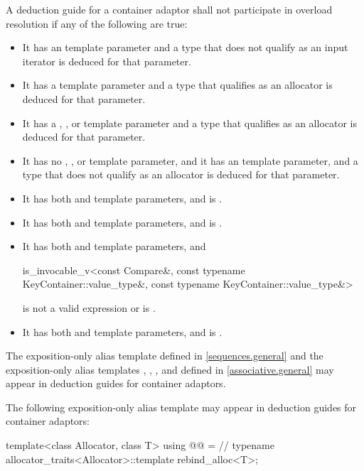 \pnum
A deduction guide for a container adaptor shall not participate in overload resolution if any of the following are true:
\begin{itemize}
\item It has an  template parameter and a type that does not qualify as an input iterator is deduced for that parameter.
\item It has a  template parameter and a type that qualifies as an allocator is deduced for that parameter.
\item It has a , , or  template parameter and a type that qualifies as an allocator is deduced for that parameter.
\item It has no , , or  template parameter, and it has an  template parameter, and a type that does not qualify as an allocator is deduced for that parameter.
\item It has both  and  template parameters, and  is .
\item It has both  and  template parameters, and
 is .
\item It has both  and  template parameters, and
\begin{codeblock}
is_invocable_v<const Compare&,
               const typename KeyContainer::value_type&,
               const typename KeyContainer::value_type&>
\end{codeblock}
is not a valid expression or is .
\item It has both  and  template parameters, and
 is .
\end{itemize}

\pnum
The exposition-only alias template 
defined in \ref{sequences.general} and
the exposition-only alias templates , ,
, and 
defined in \ref{associative.general}
may appear in deduction guides for container adaptors.

\pnum
The following exposition-only alias template
may appear in deduction guides for container adaptors:
\begin{codeblock}
template<class Allocator, class T>
  using @@ =                      // \expos
    typename allocator_traits<Allocator>::template rebind_alloc<T>;
\end{codeblock}

